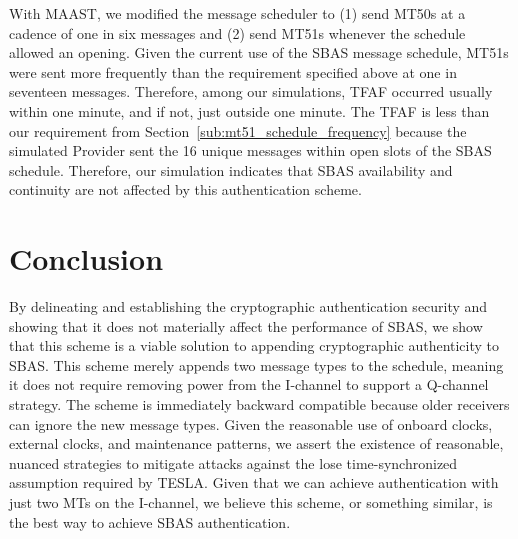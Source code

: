 \documentclass[letterpaper,times]{IONconf/IONconf}
\begin{document}
	With MAAST, we modified the message scheduler to (1) send MT50s at a cadence of one in six messages and (2) send MT51s whenever the schedule allowed an opening.
	Given the current use of the SBAS message schedule, MT51s were sent more frequently than the requirement specified above at one in seventeen messages.
	Therefore, among our simulations, TFAF occurred usually within one minute, and if not, just outside one minute.
	The TFAF is less than our requirement from Section~\ref{sub:mt51_schedule_frequency} because the simulated Provider sent the 16 unique messages within open slots of the SBAS schedule.
	Therefore, our simulation indicates that SBAS availability and continuity are not affected by this authentication scheme.

\section{Conclusion} \label{sec:conclusion}

	By delineating and establishing the cryptographic authentication security and showing that it does not materially affect the performance of SBAS, we show that this scheme is a viable solution to appending cryptographic authenticity to SBAS.
	This scheme merely appends two message types to the schedule, meaning it does not require removing power from the I-channel to support a Q-channel strategy.
	The scheme is immediately backward compatible because older receivers can ignore the new message types.
	Given the reasonable use of onboard clocks, external clocks, and maintenance patterns, we assert the existence of reasonable, nuanced strategies to mitigate attacks against the lose time-synchronized assumption required by TESLA.
	Given that we can achieve authentication with just two MTs on the I-channel, we believe this scheme, or something similar, is the best way to achieve SBAS authentication.



\end{document}
